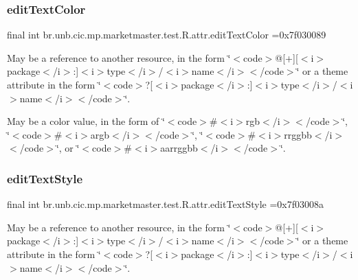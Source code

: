 \subsubsection{\texorpdfstring{edit\+Text\+Color}{editTextColor}}
{\footnotesize\ttfamily final int br.\+unb.\+cic.\+mp.\+marketmaster.\+test.\+R.\+attr.\+edit\+Text\+Color =0x7f030089\hspace{0.3cm}{\ttfamily [static]}}

May be a reference to another resource, in the form \char`\"{}$<$code$>$@\mbox{[}+\mbox{]}\mbox{[}$<$i$>$package$<$/i$>$\+:\mbox{]}$<$i$>$type$<$/i$>$/$<$i$>$name$<$/i$>$$<$/code$>$\char`\"{} or a theme attribute in the form \char`\"{}$<$code$>$?\mbox{[}$<$i$>$package$<$/i$>$\+:\mbox{]}$<$i$>$type$<$/i$>$/$<$i$>$name$<$/i$>$$<$/code$>$\char`\"{}. 

May be a color value, in the form of \char`\"{}$<$code$>$\#$<$i$>$rgb$<$/i$>$$<$/code$>$\char`\"{}, \char`\"{}$<$code$>$\#$<$i$>$argb$<$/i$>$$<$/code$>$\char`\"{}, \char`\"{}$<$code$>$\#$<$i$>$rrggbb$<$/i$>$$<$/code$>$\char`\"{}, or \char`\"{}$<$code$>$\#$<$i$>$aarrggbb$<$/i$>$$<$/code$>$\char`\"{}. \mbox{\label{classbr_1_1unb_1_1cic_1_1mp_1_1marketmaster_1_1test_1_1R_1_1attr_ada64ef79cbb846c391cbd3272742c0fd}} 
\subsubsection{\texorpdfstring{edit\+Text\+Style}{editTextStyle}}
{\footnotesize\ttfamily final int br.\+unb.\+cic.\+mp.\+marketmaster.\+test.\+R.\+attr.\+edit\+Text\+Style =0x7f03008a\hspace{0.3cm}{\ttfamily [static]}}

May be a reference to another resource, in the form \char`\"{}$<$code$>$@\mbox{[}+\mbox{]}\mbox{[}$<$i$>$package$<$/i$>$\+:\mbox{]}$<$i$>$type$<$/i$>$/$<$i$>$name$<$/i$>$$<$/code$>$\char`\"{} or a theme attribute in the form \char`\"{}$<$code$>$?\mbox{[}$<$i$>$package$<$/i$>$\+:\mbox{]}$<$i$>$type$<$/i$>$/$<$i$>$name$<$/i$>$$<$/code$>$\char`\"{}. \mbox{\label{classbr_1_1unb_1_1cic_1_1mp_1_1marketmaster_1_1test_1_1R_1_1attr_a0e1a54400e73b768c027643c0e84154f}} 
